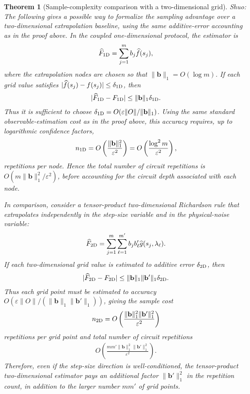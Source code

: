 \documentclass[11pt]{article}
\newtheorem{theorem}{Theorem}
\newcommand{\eps}{\varepsilon}
\begin{document}
\begin{theorem}[Sample-complexity comparison with a two-dimensional grid]
\label{thm:sample-complexity-2d-comparison}
\normalfont\color{blue}
Shuo: The following gives a possible way to formalize the sampling advantage over a two-dimensional extrapolation baseline, using the same additive-error accounting as in the proof above. In the coupled one-dimensional protocol, the estimator is
\begin{align*}
    \widehat F_{\rm 1D}=\sum_{j=1}^{m} b_j \widehat f(s_j),
\end{align*}
where the extrapolation nodes are chosen so that $\|\mathbf b\|_1=O(\log m)$. If each grid value satisfies $|\widehat f(s_j)-f(s_j)|\le \delta_{\rm 1D}$, then
\begin{align*}
    |\widehat F_{\rm 1D}-F_{\rm 1D}|
    \le \|\mathbf b\|_1 \delta_{\rm 1D}.
\end{align*}
Thus it is sufficient to choose $\delta_{\rm 1D}=O(\eps\|O\|/\|\mathbf b\|_1)$. Using the same standard observable-estimation cost as in the proof above, this accuracy requires, up to logarithmic confidence factors,
\begin{align*}
    n_{\rm 1D}=O\left(\frac{\|\mathbf b\|_1^2}{\eps^2}\right)
    =O\left(\frac{\log^2 m}{\eps^2}\right),
\end{align*}
repetitions per node. Hence the total number of circuit repetitions is $O(m\|\mathbf b\|_1^2/\eps^2)$, before accounting for the circuit depth associated with each node.

In comparison, consider a tensor-product two-dimensional Richardson rule that extrapolates independently in the step-size variable and in the physical-noise variable:
\begin{align*}
    \widehat F_{\rm 2D}=\sum_{j=1}^{m}\sum_{\ell=1}^{m'} b_j b'_{\ell}\widehat g(s_j,\lambda_\ell).
\end{align*}
If each two-dimensional grid value is estimated to additive error $\delta_{\rm 2D}$, then
\begin{align*}
    |\widehat F_{\rm 2D}-F_{\rm 2D}|
    \le \|\mathbf b\|_1\|\mathbf b'\|_1
    \delta_{\rm 2D}.
\end{align*}
Thus each grid point must be estimated to accuracy $O(\eps\|O\|/(\|\mathbf b\|_1\|\mathbf b'\|_1))$, giving the sample cost
\begin{align*}
    n_{\rm 2D}=O\left(\frac{\|\mathbf b\|_1^2\|\mathbf b'\|_1^2}{\eps^2}\right)
\end{align*}
repetitions per grid point and total number of circuit repetitions
\begin{align*}
    O\left(\frac{mm'\|\mathbf b\|_1^2\|\mathbf b'\|_1^2}{\eps^2}\right).
\end{align*}
Therefore, even if the step-size direction is well-conditioned, the tensor-product two-dimensional estimator pays an additional factor $\|\mathbf b'\|_1^2$ in the repetition count, in addition to the larger number $mm'$ of grid points.


\end{theorem}
\end{document}
